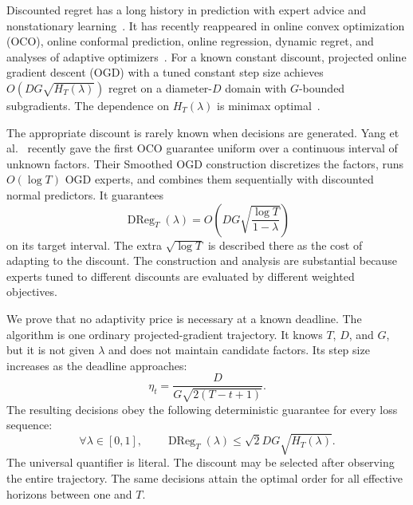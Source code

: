 \documentclass{article}
\newcommand{\DReg}{\operatorname{DReg}}
\begin{document}
Discounted regret has a long history in prediction with expert advice and nonstationary learning~\citep{freund2008hedging,kapralov2011prediction,chernov2010prediction}. It has recently reappeared in online convex optimization (OCO), online conformal prediction, online regression, dynamic regret, and analyses of adaptive optimizers~\citep{zhang2024discounted,jacobsen2024online,ahn2024understanding,xie2026dynamic}. For a known constant discount, projected online gradient descent (OGD) with a tuned constant step size achieves $O(DG\sqrt{H_T(\lambda)})$ regret on a diameter-$D$ domain with $G$-bounded subgradients. The dependence on $H_T(\lambda)$ is minimax optimal~\citep{zhang2024discounted}.

The appropriate discount is rarely known when decisions are generated. Yang et al.~\citep{yang2026uniform} recently gave the first OCO guarantee uniform over a continuous interval of unknown factors. Their Smoothed OGD construction discretizes the factors, runs $O(\!\log T)$ OGD experts, and combines them sequentially with discounted normal predictors. It guarantees
\begin{equation}
\DReg_T(\lambda)=O\!\left(DG\sqrt{\frac{\log T}{1-\lambda}}\right)
\label{eq:prior}
\end{equation}
on its target interval. The extra $\sqrt{\log T}$ is described there as the cost of adapting to the discount. The construction and analysis are substantial because experts tuned to different discounts are evaluated by different weighted objectives.

We prove that no adaptivity price is necessary at a known deadline. The algorithm is one ordinary projected-gradient trajectory. It knows $T$, $D$, and $G$, but it is not given $\lambda$ and does not maintain candidate factors. Its step size increases as the deadline approaches:
\begin{equation}
\eta_t=\frac{D}{G\sqrt{2(T-t+1)}}.
\label{eq:schedule}
\end{equation}
The resulting decisions obey the following deterministic guarantee for every loss sequence:
\begin{equation}
\forall\lambda\in[0,1],\qquad
\DReg_T(\lambda)\le\sqrt2DG\sqrt{H_T(\lambda)}.
\label{eq:headline}
\end{equation}
The universal quantifier is literal. The discount may be selected after observing the entire trajectory. The same decisions attain the optimal order for all effective horizons between one and $T$.
\end{document}

